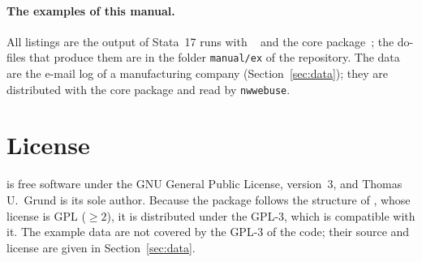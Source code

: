 \paragraph{The examples of this manual.} All listings are the output of Stata~17 runs with \nwrem{}~\pkgversion{} and the core package~\corever{}; the do-files that produce them are in the folder \texttt{manual/ex} of the repository. The data are the e-mail log of a manufacturing company (Section~\ref{sec:data}); they are distributed with the core package and read by \texttt{nwwebuse}.

\section{License}

\nwrem{} is free software under the GNU General Public License, version~3, and Thomas U.\ Grund is its sole author. Because the package follows the structure of \relevent{}, whose license is GPL ($\geq 2$), it is distributed under the GPL-3, which is compatible with it. The example data are not covered by the GPL-3 of the code; their source and license are given in Section~\ref{sec:data}.
